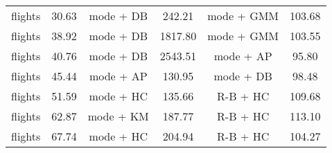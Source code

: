 \documentclass[10pt]{article} %
\numberwithin{equation}{section}
\begin{document}
\begin{table}[htbp]
\begin{subtable}{0.48\linewidth}
{\begin{tabular}{lccccc}
                flights & 30.63 & mode + DB  & 242.21 & mode + GMM & 103.68 \\
                flights & 38.92 & mode + DB  & 1817.80 & mode + GMM & 103.55 \\
                flights & 40.76 & mode + DB  & 2543.51 & mode + AP  & 95.80 \\
                flights & 45.44 & mode + AP  & 130.95 & mode + DB  & 98.48 \\
                flights & 51.59 & mode + HC  & 135.66 & R-B + HC   & 109.68 \\
                flights & 62.87 & mode + KM  & 187.77 & R-B + HC   & 113.10 \\
                flights & 67.74 & mode + HC  & 204.94 & R-B + HC   & 104.27 \\
                \bottomrule
            \end{tabular}
        }
    \end{subtable}

    \vspace{0.5em} %


\end{table}
\end{document}
